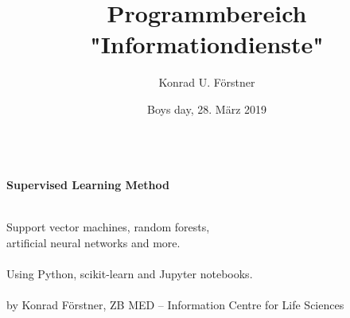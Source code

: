 \documentclass{beamer}
\title{Programmbereich "Informationdienste"}
\author{\small Konrad U. Förstner}
\institute{ZB MED -- Informationszentrum Lebenswissenschaften \&\\
  TH Köln}
\date{\scriptsize 
  Boys day, 28. März 2019\\ \ \\
}
\newcommand\addcurlyshadow[2][]{
    \begin{pgfonlayer}{background}
        \path[blur shadow={shadow xshift=0pt, shadow yshift=0pt, shadow blur steps=6}, #1]
        ($(#2.north west)+(.3ex,-.5ex)$)
        -- ($(#2.south west)+(.5ex,-.7ex)$)
        .. controls ($(#2.south)!.3!(#2.south west)$) .. (#2.south)
        .. controls ($(#2.south)!.3!(#2.south east)$) .. ($(#2.south east)+(-.5ex,-.7ex)$)
        -- ($(#2.north east)+(-.3ex, -.5ex)$)
        -- cycle;
   \end{pgfonlayer}
}
\begin{document}
\begin{frame}
  \begin{center}

    \textbf{Supervised Learning Method}\\
    \ \\

  \begin{center}
  \end{center}

  Support vector machines, random forests,\\artificial neural networks and more. \\
  \ \\
  Using Python, scikit-learn and Jupyter notebooks.\\
  \ \\

  \scriptsize{by Konrad Förstner, ZB MED -- Information Centre for Life Sciences}
  \end{center}
\end{frame}
\end{document}
